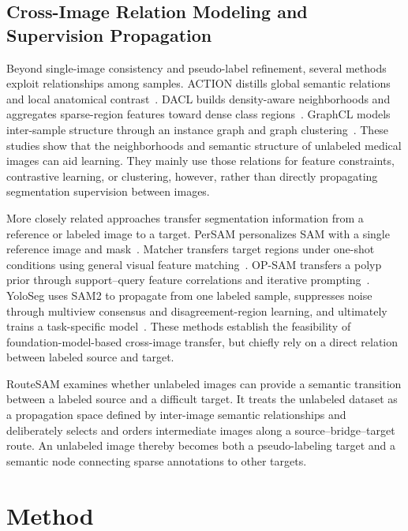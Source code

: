 \documentclass[a4paper,fleqn]{cas-dc}
\begin{document}
\subsection{Cross-Image Relation Modeling and Supervision Propagation}

Beyond single-image consistency and pseudo-label refinement, several methods exploit relationships among samples. ACTION distills global semantic relations and local anatomical contrast~\cite{you2022action}. DACL builds density-aware neighborhoods and aggregates sparse-region features toward dense class regions~\cite{tang2024dacl}. GraphCL models inter-sample structure through an instance graph and graph clustering~\cite{wang2024graphcl}. These studies show that the neighborhoods and semantic structure of unlabeled medical images can aid learning. They mainly use those relations for feature constraints, contrastive learning, or clustering, however, rather than directly propagating segmentation supervision between images.

More closely related approaches transfer segmentation information from a reference or labeled image to a target. PerSAM personalizes SAM with a single reference image and mask~\cite{zhang2023persam}. Matcher transfers target regions under one-shot conditions using general visual feature matching~\cite{liu2023matcher}. OP-SAM transfers a polyp prior through support--query feature correlations and iterative prompting~\cite{mao2025opsam}. YoloSeg uses SAM2 to propagate from one labeled sample, suppresses noise through multiview consensus and disagreement-region learning, and ultimately trains a task-specific model~\cite{zhang2026yoloseg}. These methods establish the feasibility of foundation-model-based cross-image transfer, but chiefly rely on a direct relation between labeled source and target.

RouteSAM examines whether unlabeled images can provide a semantic transition between a labeled source and a difficult target. It treats the unlabeled dataset as a propagation space defined by inter-image semantic relationships and deliberately selects and orders intermediate images along a source--bridge--target route. An unlabeled image thereby becomes both a pseudo-labeling target and a semantic node connecting sparse annotations to other targets.

\section{Method}
\label{sec:method}
\end{document}
